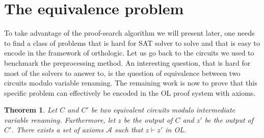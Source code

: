 \documentclass[a4paper, 11pt]{article}
\newtheorem{theorem}{Theorem}
\begin{document}
    \section{The equivalence problem}
    \label{equiv_section}
    To take advantage of the proof-search algorithm we will present later, one needs to find a class of 
    problems
    that is hard for SAT solver to solve and that is easy to encode in the framework of orthologic.
    Let us go back to the circuits we used to benchmark the preprocessing method. An interesting
    question, that is hard for most of the solvers to answer to, is the question of equivalence between
    two circuits modulo variable renaming. The remaining work is now to prove that this specific problem
    can effectively be encoded in the OL proof system with axioms.
    \begin{theorem}
	    \label{th_equiv}
	    Let $C$ and $C'$ be two equivalent circuits modulo intermediate variable renaming.
	    Furthermore, let $z$ be the output of $C$ and $z'$ be the output of $C'$. There exists
	    a set of axioms $\mathcal{A}$ such that $z\vdash z'$ in OL. 
    \end{theorem}
\end{document}
